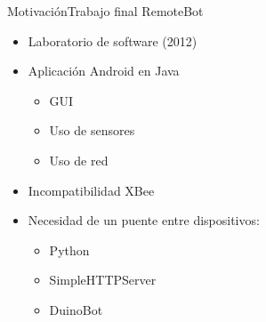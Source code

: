 \documentclass{beamer}
\begin{document}
\begin{frame}{Motivación}{Trabajo final RemoteBot}
    \begin{minipage}{0.7\linewidth}
        \begin{itemize}[<+->]
            \item Laboratorio de software (2012)
            \item Aplicación Android en Java
            \begin{itemize}
                \item GUI
                \item Uso de sensores
                \item Uso de red
            \end{itemize}
            \item Incompatibilidad XBee
            \item Necesidad de un puente entre dispositivos:
            \begin{itemize}
                \item Python
                \item SimpleHTTPServer
                \item DuinoBot
            \end{itemize}
        \end{itemize}
    \end{minipage}%
    \begin{minipage}{0.3\linewidth}
        \begin{figure}

\end{figure}
\end{minipage}
\end{frame}
\end{document}
